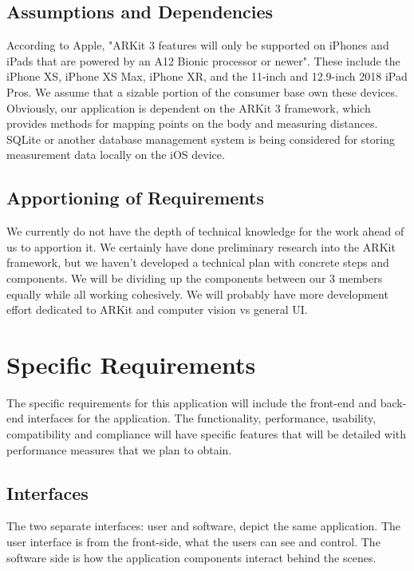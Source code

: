 \documentclass[letterpaper,10pt,draftclsnofoot,onecolumn,compsoc]{IEEEtran}
\begin{document}
\subsection{Assumptions and Dependencies}
\begin{singlespace}
\noindent
According to Apple, "ARKit 3 features will only be supported on iPhones and iPads that are powered by an A12 Bionic processor or newer"\cite{arkit3support}. These include the iPhone XS, iPhone XS Max, iPhone XR, and the 11-inch and 12.9-inch 2018 iPad Pros. We assume that a sizable portion of the consumer base own these devices.\\

Obviously, our application is dependent on the ARKit 3 framework, which provides methods for mapping points on the body and measuring distances.\\

SQLite or another database management system is being considered for storing measurement data locally on the iOS device.
\end{singlespace}

\subsection{Apportioning of Requirements}
\begin{singlespace}
\noindent
We currently do not have the depth of technical knowledge for the work ahead of us to apportion it. We certainly have done preliminary research into the ARKit framework, but we haven't developed a technical plan with concrete steps and components. We will be dividing up the components between our 3 members equally while all working cohesively. We will probably have more development effort dedicated to ARKit and computer vision vs general UI.
\end{singlespace}

\section{Specific Requirements}
\begin{singlespace}
The specific requirements for this application will include the front-end and back-end interfaces for the application. The functionality, performance, usability, compatibility and compliance will have specific features that will be detailed with performance measures that we plan to obtain.
\end{singlespace}
\subsection{Interfaces}
\begin{singlespace}
\noindent
The two separate interfaces: user and software, depict the same application. The user interface is from the front-side, what the users can see and control. The software side is how the application components interact behind the scenes.
\end{singlespace}
\end{document}
